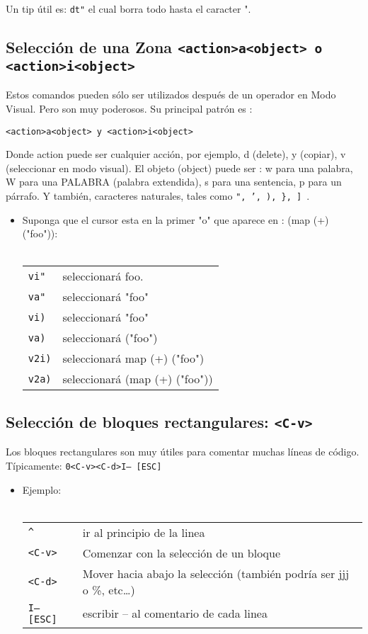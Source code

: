 \documentclass[12pt]{article}
\begin{document}
Un tip útil es: \texttt{dt"}  el cual borra todo hasta el caracter ".

\subsection{Selección de una Zona \texttt{<action>a<object> o <action>i<object>}}


Estos comandos pueden sólo ser utilizados después de un operador en Modo Visual. Pero son muy poderosos. Su principal patrón es :

\texttt{<action>a<object> y <action>i<object>}


Donde action puede ser cualquier acción, por ejemplo, d (delete), y (copiar), v (seleccionar en modo visual). El objeto (object) puede ser : w para una palabra, W para una PALABRA (palabra extendida), s para una sentencia, p para un párrafo. Y también, caracteres naturales, tales como \texttt{", ', ), \}, ] }.


\begin{itemize}
	\item Suponga que el cursor esta en la primer "o" que aparece en :  (map (+) ("foo")): \\ \\
\begin{tabular}{ l l }
	\texttt{vi"} & seleccionará foo. \\
	\texttt{va"} & seleccionará "foo" \\
	\texttt{vi)} & seleccionará "foo" \\
	\texttt{va)} & seleccionará ("foo") \\
	\texttt{v2i)} & seleccionará map (+) ("foo") \\
	\texttt{v2a)} & seleccionará (map (+) ("foo")) \\
\end{tabular}
\end{itemize}




\subsection{Selección de bloques rectangulares: \texttt{<C-v>}}


Los bloques rectangulares son muy útiles para comentar muchas
líneas de código. Típicamente:  \texttt{0<C-v><C-d>I-- [ESC]}

\begin{itemize}
	\item Ejemplo: \\ \\
\begin{tabular}{ l l }
	\texttt{\^} & ir al principio de la linea \\
	\texttt{<C-v>} & Comenzar con la selección de un bloque \\
	\texttt{<C-d>} & Mover hacia abajo la selección (también podría ser jjj o \%, etc…) \\
	\texttt{I-- [ESC]} & escribir -- al comentario de cada linea \\
\end{tabular}
\end{itemize}
\end{document}
